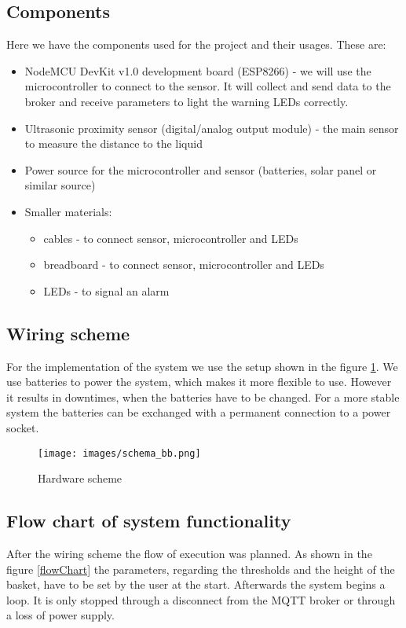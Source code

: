 \documentclass{article}
\begin{document}
\subsection{Components}
Here we have the components used for the project and their usages. These are:
\begin{itemize}
\item NodeMCU DevKit v1.0 development board (ESP8266) - we will use the
  microcontroller to connect to the sensor. It will collect and send data to the broker and
  receive parameters to light the warning LEDs correctly.
\item Ultrasonic proximity sensor (digital/analog output module) - the main
  sensor to measure the distance to the liquid
\item Power source for the microcontroller and sensor (batteries, solar panel or
  similar source)
\item Smaller materials:
	\begin{itemize}
  \item cables - to connect sensor, microcontroller and LEDs
  \item breadboard - to connect sensor, microcontroller and LEDs
  \item LEDs - to signal an alarm
	\end{itemize}
\end{itemize}

\subsection{Wiring scheme}
For the implementation of the system we use the setup shown in the figure \ref{schema_bb}. We use  batteries to power the system, which makes it more flexible to use. However it results in downtimes, when the batteries have to be changed. For a more stable system the batteries can be exchanged with a permanent connection to a power socket.

\begin{figure}[]
	\centering \texttt{[image: images/schema\_bb.png]}
	\caption{Hardware scheme}
	\label{schema_bb}
\end{figure}

\subsection{Flow chart of system functionality}
After the wiring scheme the flow of execution was planned. As shown in the figure \ref{flowChart} the parameters, regarding the thresholds and the height of the basket, have to be set by the user at the start. Afterwards the system begins a loop. It is only stopped through a disconnect from the MQTT broker or through a loss of power supply.
\end{document}
